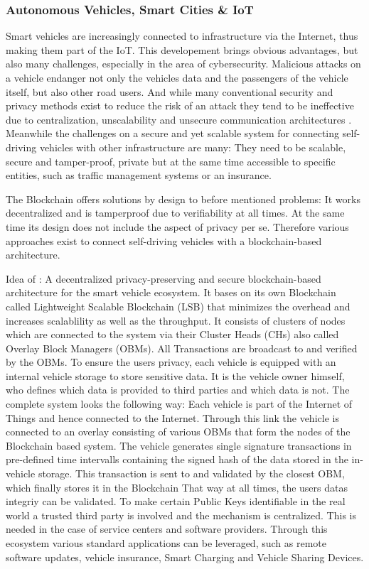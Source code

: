 \subsubsection{Autonomous Vehicles, Smart Cities \& IoT}
Smart vehicles are increasingly connected to infrastructure via the Internet, thus making them part of the IoT. This developement brings obvious advantages, but also many challenges, especially in the area of cybersecurity. Malicious attacks on a vehicle endanger not only the vehicles data and the passengers of the vehicle itself, but also other road users. And while many conventional security and privacy methods exist to reduce the risk of an attack they tend to be ineffective due to centralization, unscalability and unsecure communication architectures \cite{DorriSteger2017}.
Meanwhile the challenges on a secure and yet scalable system for connecting self-driving vehicles with other infrastructure are many: They need to be scalable, secure and tamper-proof, private but at the same time accessible to specific entities, such as traffic management systems or an insurance.

The Blockchain offers solutions by design to before mentioned problems: It works decentralized and is tamperproof due to verifiability at all times. At the same time its design does not include the aspect of privacy per se. Therefore various approaches exist to connect self-driving vehicles with a blockchain-based architecture.

Idea of \citeauthor{DorriSteger2017}: A decentralized privacy-preserving and secure blockchain-based architecture for the smart vehicle ecosystem. It bases on its own Blockchain called Lightweight Scalable Blockchain (LSB) that minimizes the overhead and increases scalablility as well as the throughput.
It consists of clusters of nodes which are connected to the system via their Cluster Heads (CHs) also called Overlay Block Managers (OBMs).  All Transactions are broadcast to and verified by the OBMs. 
To ensure the users privacy, each vehicle is equipped with an internal vehicle storage to store sensitive data. It is the vehicle owner himself, who defines which data is provided to third parties and which data is not.
The complete system looks the following way: Each vehicle is part of the Internet of Things and hence connected to the Internet. Through this link the vehicle is connected to an overlay consisting of various OBMs that form the nodes of the Blockchain based system.
The vehicle generates single signature transactions in pre-defined time intervalls containing the signed hash of the data stored in the in-vehicle storage. This transaction is sent to and validated by the closest OBM, which finally stores it in the Blockchain That way at all times, the users datas integriy can be validated.
To make certain Public Keys identifiable in the real world a trusted third party is involved and the mechanism is centralized. This is needed in the case of service centers and software providers.
Through this ecosystem various standard applications can be leveraged, such as remote software updates, vehicle insurance, Smart Charging and Vehicle Sharing Devices.

